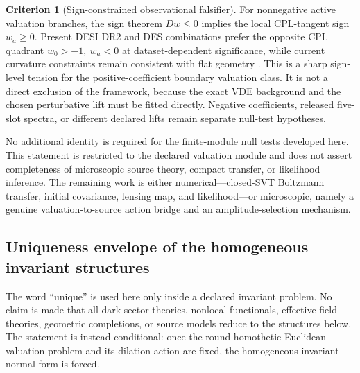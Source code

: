 \documentclass[11pt,a4paper]{article}
\def\Dil{D}%
\numberwithin{equation}{section}
\theoremstyle{definition}
\newtheorem{criterion}{Criterion}
\theoremstyle{plain}
\theoremstyle{remark}
\newcommand{\Dil}{\mathscr{D}}
\begin{document}
\begin{criterion}[Sign-constrained observational falsifier]
For nonnegative active valuation branches, the sign theorem
\(\Dil w\le0\) implies the local CPL-tangent sign \(w_a\ge0\).  Present DESI
DR2 and DES combinations prefer the opposite CPL quadrant
\(w_0>-1,\ w_a<0\) at dataset-dependent significance, while current curvature
constraints remain consistent with flat geometry \cite{DESI2025DR2BAO,DESY6DynamicalDE2026,Planck2018Parameters,ACTDR6Extended2025}.  This is a
sharp sign-level tension for the positive-coefficient boundary valuation class.
It is not a direct exclusion of the framework, because the exact VDE background
and the chosen perturbative lift must be fitted directly.  Negative
coefficients, released five-slot spectra, or different declared lifts remain
separate null-test hypotheses.
\end{criterion}

No additional identity is required for the finite-module null tests developed
here.  This statement is restricted to the declared valuation module and does
not assert completeness of microscopic source theory, compact transfer, or
likelihood inference.  The remaining work is either numerical---closed-SVT
Boltzmann transfer, initial covariance, lensing map, and likelihood---or
microscopic, namely a genuine valuation-to-source action bridge and an
amplitude-selection mechanism.




\subsection{Uniqueness envelope of the homogeneous invariant structures}
\label{sec:uniqueness-envelope}

The word ``unique'' is used here only inside a declared invariant problem.  No
claim is made that all dark-sector theories, nonlocal functionals, effective
field theories, geometric completions, or source models reduce to the
structures below.  The statement is instead conditional: once the round
homothetic Euclidean valuation problem and its dilation action are fixed, the
homogeneous invariant normal form is forced.
\end{document}
